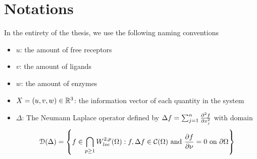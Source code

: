 \section{Notations}

In the entirety of the thesis, we use the following naming conventions

\begin{itemize}
    \item $u$: the amount of free receptors
    \item $v$: the amount of ligands
    \item $w$: the amount of enzymes
    \item $X = (u, v, w) \in \mathbb{R}^3$: the information vector of each quantity in the system
    \item $\Delta$: The Neumann Laplace operator defined by $\Delta f = \sum_{j = 1}^n \frac{\partial^2 f}{\partial x_j^2}$ with domain $$\EuScript{D}(\Delta) = \left\{ f \in \bigcap_{p\ge 1} W_{loc}^{2, p}(\Omega) : f, \Delta f \in \mathcal{C}(\Omega) \text{ and } \frac{\partial f}{\partial \nu} = 0 \text{ on } \partial\Omega \right\}$$
\end{itemize}